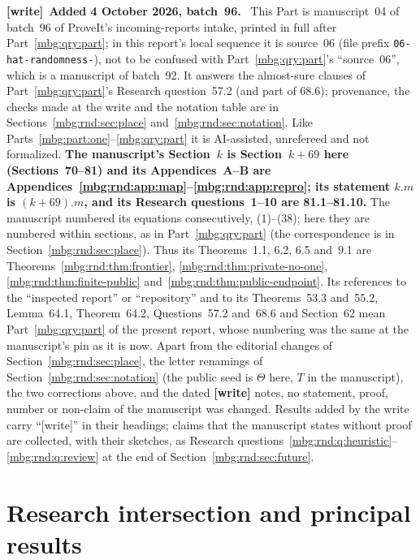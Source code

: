 \documentclass[11pt,letterpaper]{article}
\theoremstyle{definition}
\newenvironment{writenote}[1][]{\par\smallskip\begingroup\small
 \noindent\textbf{[write]}\if\relax\detokenize{#1}\relax\else~\textbf{#1.}\fi\ }%
 {\par\endgroup\smallskip}
\begin{document}
\begin{writenote}[Added 4 October 2026, batch~96]
This Part is manuscript~04 of batch~96 of ProveIt's incoming-reports intake, printed in full after Part~\ref{mbg:qry:part}; in this report's local sequence it is source~06 (file prefix \texttt{06-hat-randomness-}), not to be confused with Part~\ref{mbg:qry:part}'s ``source~06'', which is a manuscript of batch~92. It answers the almost-sure clauses of Part~\ref{mbg:qry:part}'s Research question~57.2 (and part of 68.6); provenance, the checks made at the write and the notation table are in Sections~\ref{mbg:rnd:sec:place} and~\ref{mbg:rnd:sec:notation}. Like Parts~\ref{mbg:part:one}--\ref{mbg:qry:part} it is AI-assisted, unrefereed and not formalized. \textbf{The manuscript's Section~$k$ is Section~$k+69$ here (Sections~70--81) and its Appendices~A--B are Appendices~\ref{mbg:rnd:app:map}--\ref{mbg:rnd:app:repro}; its statement $k.m$ is $(k+69).m$, and its Research questions~1--10 are 81.1--81.10.} The manuscript numbered its equations consecutively, (1)--(38); here they are numbered within sections, as in Part~\ref{mbg:qry:part} (the correspondence is in Section~\ref{mbg:rnd:sec:place}). Thus its Theorems~1.1, 6.2, 6.5 and~9.1 are Theorems~\ref{mbg:rnd:thm:frontier}, \ref{mbg:rnd:thm:private-no-one}, \ref{mbg:rnd:thm:finite-public} and~\ref{mbg:rnd:thm:public-endpoint}. Its references to the ``inspected report'' or ``repository'' and to its Theorems~53.3 and~55.2, Lemma~64.1, Theorem~64.2, Questions~57.2 and~68.6 and Section~62 mean Part~\ref{mbg:qry:part} of the present report, whose numbering was the same at the manuscript's pin as it is now. Apart from the editorial changes of Section~\ref{mbg:rnd:sec:place}, the letter renamings of Section~\ref{mbg:rnd:sec:notation} (the public seed is $\Theta$ here, $T$ in the manuscript), the two corrections above, and the dated \textbf{[write]} notes, no statement, proof, number or non-claim of the manuscript was changed. Results added by the write carry ``[write]'' in their headings; claims that the manuscript states without proof are collected, with their sketches, as Research questions~\ref{mbg:rnd:q:heuristic}--\ref{mbg:rnd:q:review} at the end of Section~\ref{mbg:rnd:sec:future}.
\end{writenote}

\section{Research intersection and principal results}
\label{mbg:rnd:sec:introduction}
\end{document}
